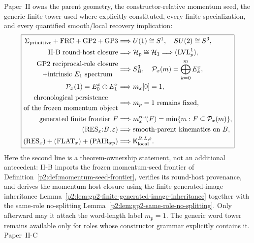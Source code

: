 \documentclass[12pt,a4paper]{article}
\begin{document}
\begin{remark}
\label{p2:rem:carrier-seed-unfolding}
Paper~II owns the parent geometry, the constructor-relative momentum seed, the
generic finite tower used where explicitly constituted, every finite
specialization, and every quantified smooth/local recovery implication:
\[
\boxed{\begin{aligned}
 \Sigma_{\rm primitive}+\mathrm{FRC}+\mathrm{GP2}+\mathrm{GP3}
 &\Longrightarrow U(1)\cong S^1,\quad SU(2)\cong S^3,\\
 \text{II-B round-host closure}
 &\Longrightarrow \mathcal H_p\cong\mathcal H_1
    \Longrightarrow (\mathrm{LVL}_p^1),\\
 \begin{gathered}\text{GP2 reciprocal-role closure}\\
   +\text{intrinsic }E_1\text{ spectrum}\end{gathered}
 &\Longrightarrow S^3_B,\quad
   \mathcal P_x(m)=\bigoplus_{k=0}^{m}E_k^x,\\
 \mathcal P_x(1)=E_0^x\oplus E_1^x
 &\Longrightarrow m_x[0]=1,\\
 \begin{gathered}\text{chronological persistence}\\
   \text{of the frozen momentum object}\end{gathered}
 &\Longrightarrow m_p=1\text{ remains fixed},\\
 \text{generated finite frontier }F
 &\Longrightarrow m_x^{\rm res}(F)
   =\min\{m:F\subseteq\mathcal P_x(m)\},\\
 (\mathrm{RES}_x{:}B,\varepsilon)
 &\Longrightarrow \text{smooth-parent kinematics on }B,\\
 (\mathrm{RES}_x)+(\mathrm{FLAT}_x)+(\mathrm{PAIR}_{xp})
 &\Longrightarrow \mathsf K_{\rm local}^{B,L,\varepsilon}.
\end{aligned}}
\]
Here the second line is a theorem-ownership statement, not an additional
antecedent: II-B imports the frozen momentum-seed frontier of
Definition~\ref{p2:def:momentum-seed-frontier}, verifies its round-host
provenance, and derives the momentum host closure using the finite
generated-image inheritance
Lemma~\ref{p2:lem:gp2-finite-generated-image-inheritance} together with the
same-role no-splitting Lemma~\ref{p2:lem:gp2-same-role-no-splitting}.  Only afterward may it attach
the word-length label \(m_p=1\).  The generic word tower remains available only
for roles whose constructor grammar explicitly contains it.  Paper~II-C

\end{remark}
\end{document}
